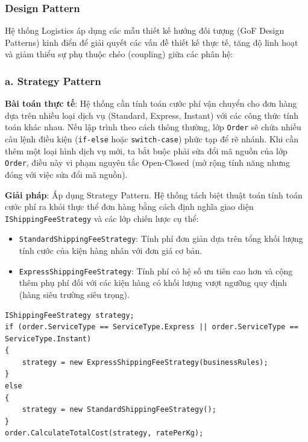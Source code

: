 \documentclass[12pt,a4paper]{article}
\begin{document}
\subsubsection{Design Pattern}

Hệ thống Logistics áp dụng các mẫu thiết kế hướng đối tượng (GoF Design Patterns) kinh điển để giải quyết các vấn đề thiết kế thực tế, tăng độ linh hoạt và giảm thiểu sự phụ thuộc chéo (coupling) giữa các phân hệ:

\subsubsection*{a. Strategy Pattern}

\textbf{Bài toán thực tế}: Hệ thống cần tính toán cước phí vận chuyển cho đơn hàng dựa trên nhiều loại dịch vụ (Standard, Express, Instant) với các công thức tính toán khác nhau. Nếu lập trình theo cách thông thường, lớp \texttt{Order} sẽ chứa nhiều câu lệnh điều kiện (\texttt{if-else} hoặc \texttt{switch-case}) phức tạp để rẽ nhánh. Khi cần thêm một loại hình dịch vụ mới, ta bắt buộc phải sửa đổi mã nguồn của lớp \texttt{Order}, điều này vi phạm nguyên tắc Open-Closed (mở rộng tính năng nhưng đóng với việc sửa đổi mã nguồn).

\textbf{Giải pháp}: Áp dụng Strategy Pattern. Hệ thống tách biệt thuật toán tính toán cước phí ra khỏi thực thể đơn hàng bằng cách định nghĩa giao diện \texttt{IShippingFeeStrategy} và các lớp chiến lược cụ thể:
\begin{itemize}[leftmargin=1.2cm]
    \item \texttt{StandardShippingFeeStrategy}: Tính phí đơn giản dựa trên tổng khối lượng tính cước của kiện hàng nhân với đơn giá cơ bản.
    \item \texttt{ExpressShippingFeeStrategy}: Tính phí có hệ số ưu tiên cao hơn và cộng thêm phụ phí đối với các kiện hàng có khối lượng vượt ngưỡng quy định (hàng siêu trường siêu trọng).
\end{itemize}

\begin{listing}[H]
\caption{Ví dụ Strategy tính phí vận chuyển trong OrderService}
\begin{verbatim}
IShippingFeeStrategy strategy;
if (order.ServiceType == ServiceType.Express || order.ServiceType == ServiceType.Instant)
{
    strategy = new ExpressShippingFeeStrategy(businessRules);
}
else
{
    strategy = new StandardShippingFeeStrategy();
}
order.CalculateTotalCost(strategy, ratePerKg);
\end{verbatim}
\end{listing}
\end{document}
